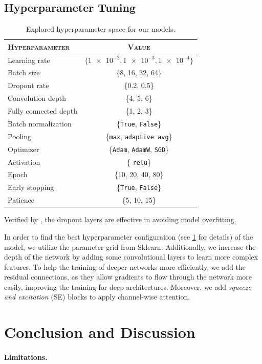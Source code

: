 \subsection{Hyperparameter Tuning}
\label{sec:optim:tuning}

\begin{table}[ht]
  \centering
  \begin{tabular}{@{}lc@{}}
    \toprule
    \textsc{Hyperparameter} & \textsc{Value} \\
    \midrule
    Learning rate & $ \{\num{1e-2}, \num{1e-3}, \num{1e-4} \} $ \\
    Batch size & \{8, 16, 32, 64\} \\
    Dropout rate & \{0.2, 0.5\} \\
    Convolution depth & \{4, 5, 6\} \\
    Fully connected depth & \{1, 2, 3\} \\
    Batch normalization & \{\texttt{True}, \texttt{False}\} \\
    Pooling & \{\texttt{max}, \texttt{adaptive avg}\} \\
    Optimizer & \{\texttt{Adam}, \texttt{AdamW}, \texttt{SGD}\} \\
    Activation & \{ \texttt{relu}\} \\ %
    Epoch & \{10, 20, 40, 80\} \\
    Early stopping & \{\texttt{True}, \texttt{False}\} \\
    Patience & \{5, 10, 15\} \\
    \bottomrule
  \end{tabular}
  \caption{Explored hyperparameter space for our models.}
  \label{tab:hyper}
\end{table}

Verified by \citet{BarsoumZCZ16}, 
the dropout layers are effective in avoiding model overfitting. 

In order to find the best hyperparameter configuration (see \cref{tab:hyper} for details) of the model, 
we utilize the parameter grid from Sklearn.
Additionally, 
we increase the depth of the network by adding some convolutional layers to learn more complex features. 
To help the training of deeper networks more efficiently, 
we add the residual connections, 
as they allow gradients to flow through the network more easily, 
improving the training for deep architectures. 
Moreover, 
we add \textit{squeeze and excitation} (SE) blocks to apply channel-wise attention. 

\section{Conclusion and Discussion}
\label{sec:conclusion}

\paragraph{Limitations.}

\newpage
